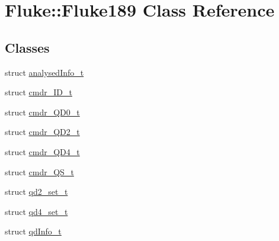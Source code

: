 \hypertarget{classFluke_1_1Fluke189}{
\section{Fluke::Fluke189 Class Reference}
\label{classFluke_1_1Fluke189}
}
\subsection*{Classes}
\begin{DoxyCompactItemize}
\item 
struct \hyperlink{structFluke_1_1Fluke189_1_1analysedInfo__t}{analysedInfo\_\-t}
\item 
struct \hyperlink{structFluke_1_1Fluke189_1_1cmdr__ID__t}{cmdr\_\-ID\_\-t}
\item 
struct \hyperlink{structFluke_1_1Fluke189_1_1cmdr__QD0__t}{cmdr\_\-QD0\_\-t}
\item 
struct \hyperlink{structFluke_1_1Fluke189_1_1cmdr__QD2__t}{cmdr\_\-QD2\_\-t}
\item 
struct \hyperlink{structFluke_1_1Fluke189_1_1cmdr__QD4__t}{cmdr\_\-QD4\_\-t}
\item 
struct \hyperlink{structFluke_1_1Fluke189_1_1cmdr__QS__t}{cmdr\_\-QS\_\-t}
\item 
struct \hyperlink{structFluke_1_1Fluke189_1_1qd2__set__t}{qd2\_\-set\_\-t}
\item 
struct \hyperlink{structFluke_1_1Fluke189_1_1qd4__set__t}{qd4\_\-set\_\-t}
\item 
struct \hyperlink{structFluke_1_1Fluke189_1_1qdInfo__t}{qdInfo\_\-t}
\end{DoxyCompactItemize}
